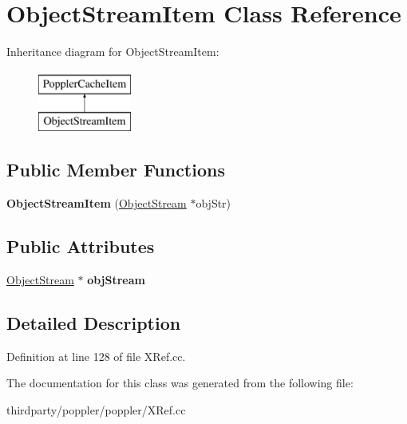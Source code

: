 \hypertarget{class_object_stream_item}{}\section{Object\+Stream\+Item Class Reference}
\label{class_object_stream_item}
Inheritance diagram for Object\+Stream\+Item\+:\begin{figure}[H]
\begin{center}
\leavevmode
\includegraphics[height=2.000000cm]{class_object_stream_item}
\end{center}
\end{figure}
\subsection*{Public Member Functions}
\begin{DoxyCompactItemize}
\item 
\mbox{\label{class_object_stream_item_a62edf392741744c14a27aec0d385371e}} 
{\bfseries Object\+Stream\+Item} (\hyperlink{class_object_stream}{Object\+Stream} $\ast$obj\+Str)
\end{DoxyCompactItemize}
\subsection*{Public Attributes}
\begin{DoxyCompactItemize}
\item 
\mbox{\label{class_object_stream_item_a9a2565eaf7d29c2caae74c0038962529}} 
\hyperlink{class_object_stream}{Object\+Stream} $\ast$ {\bfseries obj\+Stream}
\end{DoxyCompactItemize}


\subsection{Detailed Description}


Definition at line 128 of file X\+Ref.\+cc.



The documentation for this class was generated from the following file\+:\begin{DoxyCompactItemize}
\item 
thirdparty/poppler/poppler/X\+Ref.\+cc\end{DoxyCompactItemize}
